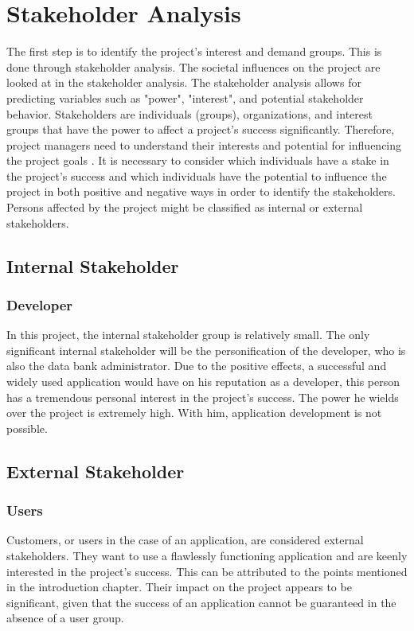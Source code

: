 \section{Stakeholder Analysis}
The first step is to identify the project's interest and demand groups. This is done through stakeholder analysis. The societal influences on the project are looked at in the stakeholder analysis. The stakeholder analysis allows for predicting variables such as "power", "interest", and potential stakeholder behavior. Stakeholders are individuals (groups), organizations, and interest groups that have the power to affect a project's success significantly. Therefore, project managers need to understand their interests and potential for influencing the project goals \cite[p. 28]{.stakeholder}. It is necessary to consider which individuals have a stake in the project's success and which individuals have the potential to influence the project in both positive and negative ways in order to identify the stakeholders. Persons affected by the project might be classified as internal or external stakeholders. 

\subsection{Internal Stakeholder}
\subsubsection{Developer}
In this project, the internal stakeholder group is relatively small. The only significant internal stakeholder will be the personification of the developer, who is also the data bank administrator. Due to the positive effects, a successful and widely used application would have on his reputation as a developer, this person has a tremendous personal interest in the project's success. The power he wields over the project is extremely high. With him, application development is not possible.

\subsection{External Stakeholder}
\subsubsection{Users}
Customers, or users in the case of an application, are considered external stakeholders. They want to use a flawlessly functioning application and are keenly interested in the project's success. This can be attributed to the points mentioned in the introduction chapter. Their impact on the project appears to be significant, given that the success of an application cannot be guaranteed in the absence of a user group.

